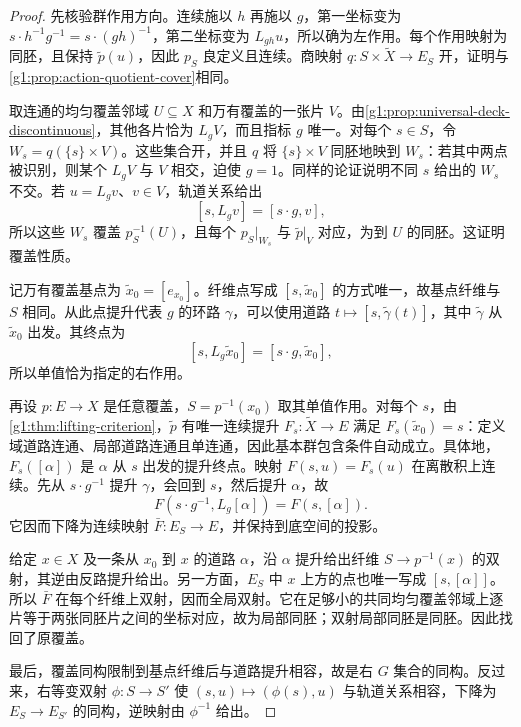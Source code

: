 \begin{proof}
	先核验群作用方向。连续施以 \(h\) 再施以 \(g\)，第一坐标变为 \(s\cdot h^{-1}g^{-1}=s\cdot(gh)^{-1}\)，第二坐标变为 \(L_{gh}u\)，所以确为左作用。每个作用映射为同胚，且保持 \(\widetilde p(u)\)，因此 \(p_S\) 良定义且连续。商映射 \(q:S\times\widetilde X\rightarrow E_S\) 开，证明与\cref{g1:prop:action-quotient-cover}相同。

	取连通的均匀覆盖邻域 \(U\subseteq X\) 和万有覆盖的一张片 \(V\)。由\cref{g1:prop:universal-deck-discontinuous}，其他各片恰为 \(L_gV\)，而且指标 \(g\) 唯一。对每个 \(s\in S\)，令 \(W_s=q(\{s\}\times V)\)。这些集合开，并且 \(q\) 将 \(\{s\}\times V\) 同胚地映到 \(W_s\)：若其中两点被识别，则某个 \(L_gV\) 与 \(V\) 相交，迫使 \(g=1\)。同样的论证说明不同 \(s\) 给出的 \(W_s\) 不交。若 \(u=L_gv\)、\(v\in V\)，轨道关系给出
	\begin{equation}\label{g1:eq:associated-cover-relation}
		[s,L_gv]=[s\cdot g,v],
	\end{equation}
	所以这些 \(W_s\) 覆盖 \(p_S^{-1}(U)\)，且每个 \(p_S|_{W_s}\) 与 \(\widetilde p|_V\) 对应，为到 \(U\) 的同胚。这证明覆盖性质。

	记万有覆盖基点为 \(\widetilde x_0=[e_{x_0}]\)。纤维点写成 \([s,\widetilde x_0]\) 的方式唯一，故基点纤维与 \(S\) 相同。从此点提升代表 \(g\) 的环路 \(\gamma\)，可以使用道路 \(t\mapsto[s,\widetilde\gamma(t)]\)，其中 \(\widetilde\gamma\) 从 \(\widetilde x_0\) 出发。其终点为
	\[
		[s,L_g\widetilde x_0]=[s\cdot g,\widetilde x_0],
	\]
	所以单值恰为指定的右作用。

	再设 \(p:E\rightarrow X\) 是任意覆盖，\(S=p^{-1}(x_0)\) 取其单值作用。对每个 \(s\)，由\cref{g1:thm:lifting-criterion}，\(\widetilde p\) 有唯一连续提升 \(F_s:\widetilde X\rightarrow E\) 满足 \(F_s(\widetilde x_0)=s\)：定义域道路连通、局部道路连通且单连通，因此基本群包含条件自动成立。具体地，\(F_s([\alpha])\) 是 \(\alpha\) 从 \(s\) 出发的提升终点。映射 \(F(s,u)=F_s(u)\) 在离散积上连续。先从 \(s\cdot g^{-1}\) 提升 \(\gamma\)，会回到 \(s\)，然后提升 \(\alpha\)，故
	\[
		F(s\cdot g^{-1},L_g[\alpha])=F(s,[\alpha]).
	\]
	它因而下降为连续映射 \(\bar F:E_S\rightarrow E\)，并保持到底空间的投影。

	给定 \(x\in X\) 及一条从 \(x_0\) 到 \(x\) 的道路 \(\alpha\)，沿 \(\alpha\) 提升给出纤维 \(S\rightarrow p^{-1}(x)\) 的双射，其逆由反路提升给出。另一方面，\(E_S\) 中 \(x\) 上方的点也唯一写成 \([s,[\alpha]]\)。所以 \(\bar F\) 在每个纤维上双射，因而全局双射。它在足够小的共同均匀覆盖邻域上逐片等于两张同胚片之间的坐标对应，故为局部同胚；双射局部同胚是同胚。因此找回了原覆盖。

	最后，覆盖同构限制到基点纤维后与道路提升相容，故是右 \(G\) 集合的同构。反过来，右等变双射 \(\phi:S\rightarrow S'\) 使 \((s,u)\mapsto(\phi(s),u)\) 与轨道关系相容，下降为 \(E_S\rightarrow E_{S'}\) 的同构，逆映射由 \(\phi^{-1}\) 给出。
\end{proof}

